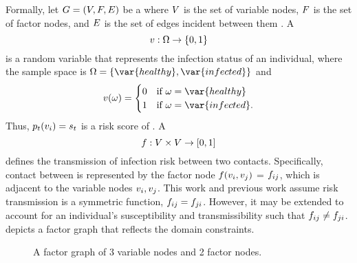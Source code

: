 Formally, let $G = (V, F, E)$ be a  where $V$ is the set of variable nodes, $F$ is the set of factor nodes, and $E$ is the set of edges incident between them \cite{Kschischang2001}. A  
%
\begin{equation*}
   \vVariable: \eventSpace \rightarrow \{0, 1\} 
\end{equation*}
%
is a random variable that represents the infection status of an individual, where the sample space is $\eventSpace = \{\var{healthy}, \var{infected}\}$ and
%
\begin{equation*}
    \vVariable(\event) =
        \begin{cases}
            0 & \text{if } \event = \var{healthy} \\
            1 & \text{if } \event = \var{infected}.
        \end{cases}
\end{equation*}
%
Thus, $\pr{\vVariable[i]}[t] = \vScore_t$ is a risk score of . A  
%
\begin{equation*}
    \vFactor: \vVariables \times \vVariables \rightarrow [0, 1]
\end{equation*}
%
defines the transmission of infection risk between two contacts. Specifically, contact between  is represented by the factor node $\vFactor(\vVariable[i], \vVariable[j])$ = $\vFactor[ij]$, which is adjacent to the variable nodes $\vVariable[i], \vVariable[j]$. This work and previous work \cite{Ayday2021} assume risk transmission is a symmetric function, $\vFactor[ij] = \vFactor[ji]$. However, it may be extended to account for an individual's susceptibility and transmissibility such that $\vFactor[ij] \neq \vFactor[ji]$.  depicts a factor graph that reflects the domain constraints.
%
\begin{figure}[htbp]
    \centering
    \caption[Factor graph]{A factor graph of 3 variable nodes and 2 factor nodes.}
    \label{fig:factor-graph}
\end{figure}

